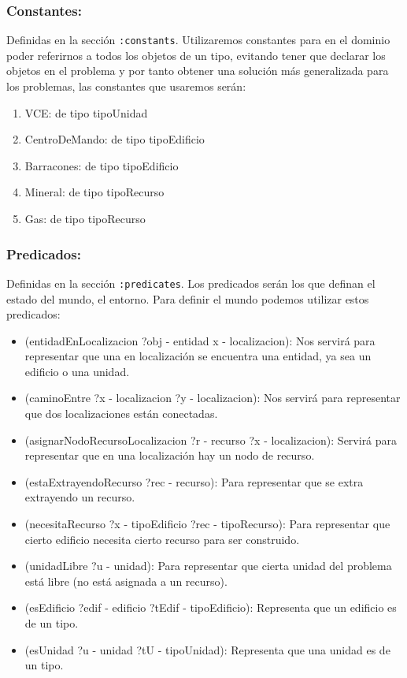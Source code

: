 \documentclass[11pt, spanish]{article}
\begin{document}
\subsubsection{Constantes:}

Definidas en la sección \texttt{:constants}. Utilizaremos constantes para en el dominio poder referirnos a todos los objetos de un tipo, evitando tener que declarar los objetos en el problema y por tanto obtener una solución más generalizada para los problemas, las constantes que usaremos serán:

\begin{enumerate}
	\item VCE: de tipo tipoUnidad
	\item CentroDeMando: de tipo tipoEdificio
	\item Barracones: de tipo tipoEdificio
	\item Mineral: de tipo tipoRecurso
	\item Gas: de tipo tipoRecurso
\end{enumerate}


\subsubsection{Predicados:}


Definidas en la sección \texttt{:predicates}. Los predicados serán los que definan el estado del mundo, el entorno. Para definir el mundo podemos utilizar estos predicados:

\begin{itemize}
	\item (entidadEnLocalizacion ?obj - entidad x - localizacion): Nos servirá para representar que una en localización se encuentra una entidad, ya sea un edificio o una unidad.
	\item (caminoEntre ?x - localizacion ?y - localizacion): Nos servirá para representar que dos localizaciones están conectadas.
	\item (asignarNodoRecursoLocalizacion ?r - recurso ?x - localizacion): Servirá para representar que en una localización hay un nodo de recurso.
	\item (estaExtrayendoRecurso ?rec - recurso): Para representar que se extra extrayendo un recurso.
	\item (necesitaRecurso ?x - tipoEdificio ?rec - tipoRecurso): Para representar que cierto edificio necesita cierto recurso para ser construido.
	\item (unidadLibre ?u - unidad): Para representar que cierta unidad del problema está libre (no está asignada a un recurso).
	\item (esEdificio ?edif - edificio ?tEdif - tipoEdificio): Representa que un edificio es de un tipo.
	\item (esUnidad ?u - unidad ?tU - tipoUnidad): Representa que una unidad es de un tipo.
	
\end{itemize}
\end{document}
